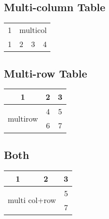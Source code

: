 \documentclass[14pt, a4paper]{article} %
\begin{document}
\subsection{Multi-column Table}

\begin{tabular}{|c|ccc|}
	\hline
	1 & \multicolumn{3}{c|}{multicol} \\ 
	\cline{2-4}
	1 & 2 & 3 & 4  \\
	\hline

\end{tabular}


\subsection{Multi-row Table}

\begin{tabular}{|c|c|c|}
	\hline
	1 & 2 & 3 \\ 
	\hline
	\multirow{2}{*}{multirow} & 4 & 5 \\
	& 6 & 7 \\ 
	\hline
\end{tabular}

\subsection{Both}

\begin{tabular}{|cc|c|}
	\hline
	1 & 2 & 3 \\ 
	\hline
	\multicolumn{2}{|c|}{\multirow{2}{*}{multi col+row}} & 5 \\
	& & 7 \\
	\hline
\end{tabular}
\end{document}
